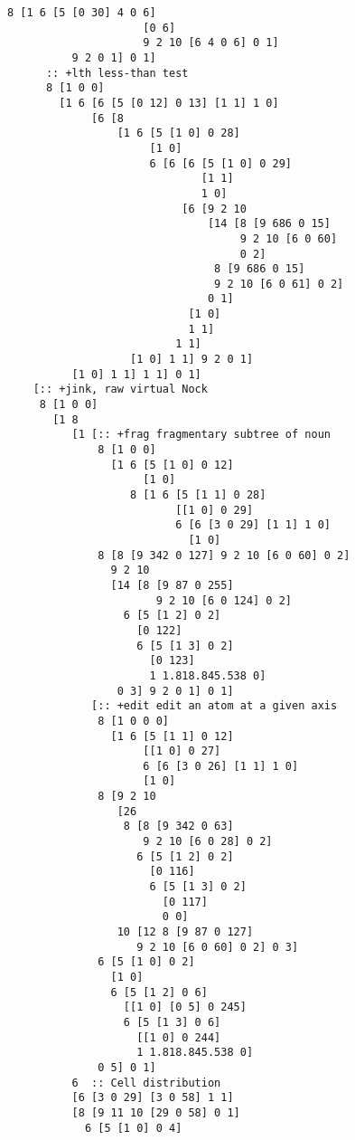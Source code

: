 \documentclass[twoside]{article}
\begin{document}
\begin{lstlisting}[style=listingcode]
              8 [1 6 [5 [0 30] 4 0 6]
                     [0 6]
                     9 2 10 [6 4 0 6] 0 1]
          9 2 0 1] 0 1]
      :: +lth less-than test
      8 [1 0 0]
        [1 6 [6 [5 [0 12] 0 13] [1 1] 1 0]
             [6 [8
                 [1 6 [5 [1 0] 0 28]
                      [1 0]
                      6 [6 [6 [5 [1 0] 0 29]
                              [1 1]
                              1 0]
                           [6 [9 2 10
                               [14 [8 [9 686 0 15]
                                    9 2 10 [6 0 60]
                                    0 2]
                                8 [9 686 0 15]
                                9 2 10 [6 0 61] 0 2]
                               0 1]
                            [1 0]
                            1 1]
                          1 1]
                   [1 0] 1 1] 9 2 0 1]
          [1 0] 1 1] 1 1] 0 1]
    [:: +jink, raw virtual Nock
     8 [1 0 0]
       [1 8
          [1 [:: +frag fragmentary subtree of noun
              8 [1 0 0]
                [1 6 [5 [1 0] 0 12]
                     [1 0]
                   8 [1 6 [5 [1 1] 0 28]
                          [[1 0] 0 29]
                          6 [6 [3 0 29] [1 1] 1 0]
                            [1 0]
              8 [8 [9 342 0 127] 9 2 10 [6 0 60] 0 2]
                9 2 10
                [14 [8 [9 87 0 255]
                       9 2 10 [6 0 124] 0 2]
                  6 [5 [1 2] 0 2]
                    [0 122]
                    6 [5 [1 3] 0 2]
                      [0 123]
                      1 1.818.845.538 0]
                 0 3] 9 2 0 1] 0 1]
             [:: +edit edit an atom at a given axis
              8 [1 0 0 0]
                [1 6 [5 [1 1] 0 12]
                     [[1 0] 0 27]
                     6 [6 [3 0 26] [1 1] 1 0]
                     [1 0]
              8 [9 2 10
                 [26
                  8 [8 [9 342 0 63]
                     9 2 10 [6 0 28] 0 2]
                    6 [5 [1 2] 0 2]
                      [0 116]
                      6 [5 [1 3] 0 2]
                        [0 117]
                        0 0]
                 10 [12 8 [9 87 0 127]
                    9 2 10 [6 0 60] 0 2] 0 3]
              6 [5 [1 0] 0 2]
                [1 0]
                6 [5 [1 2] 0 6]
                  [[1 0] [0 5] 0 245]
                  6 [5 [1 3] 0 6]
                    [[1 0] 0 244]
                    1 1.818.845.538 0]
              0 5] 0 1]
          6  :: Cell distribution
          [6 [3 0 29] [3 0 58] 1 1]
          [8 [9 11 10 [29 0 58] 0 1]
            6 [5 [1 0] 0 4]

\end{lstlisting}
\end{document}
